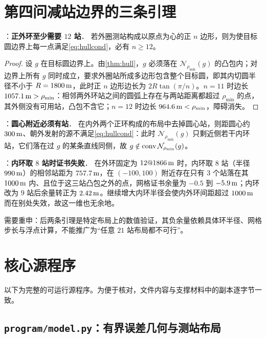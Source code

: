 \begin{appendices}
\section{第四问减站边界的三条引理}\label{app:q4}

\begin{lemma}：\textbf{正外环至少需要 $12$ 站}．\label{lem:outer12}
若外圈测站构成以原点为心的正 $n$ 边形，则为使目标圆边界上每一点满足\cref{eq:hullcond}，必有 $n\ge12$。
\end{lemma}
\begin{proof}
设 $g$ 在目标圆边界上。由\cref{thm:hull}，$g$ 必须落在 $\mathcal N_{\rho_{\min}}(g)$ 的凸包内；对边界上所有 $g$ 同时成立，要求外圈站所成多边形包含整个目标圆，即其内切圆半径不小于 $R=1800\,\mathrm{m}$，此时正 $n$ 边形边长为 $2R\tan(\pi/n)$。$n=11$ 时边长 $1057.1\,\mathrm{m}>\rho_{\min}$：相邻两外环站之间的圆弧上存在与两站距离都超过 $\rho_{\min}$ 的点，其外侧没有可用站，凸包不含它；$n=12$ 时边长 $964.6\,\mathrm{m}<\rho_{\min}$，障碍消失。
\end{proof}

\begin{lemma}：\textbf{圆心附近必须有站}．\label{lem:center}
在内外两个正环构成的布局中去掉圆心站，则距圆心约 $300\,\mathrm{m}$、朝外发射的源不满足\cref{eq:hullcond}：此时 $\mathcal N_{\rho_{\min}}(g)$ 只剩近侧若干内环站，它们落在过 $g$ 的某条直线同侧，故 $g\notin\operatorname{conv}\mathcal N_{\rho_{\min}}(g)$。
\end{lemma}

\begin{lemma}：\textbf{内环取 $8$ 站时证书失败}．\label{lem:inner9}
在外环固定为 $12@1866\,\mathrm{m}$ 时，内环取 $8$ 站（半径 $990\,\mathrm{m}$）的相邻站距为 $757.7\,\mathrm{m}$，在 $(-100,100)$ 附近存在只有 $3$ 个站落在其 $1000\,\mathrm{m}$ 内、且位于这三站凸包之外的点，网格证书余量为 $-0.5$ 到 $-5.9\,\mathrm{m}$；内环改为 $9$ 站后余量转正为 $2.42\,\mathrm{m}$。继续增大内环半径会使内外环间距超过 $1000\,\mathrm{m}$ 而在别处失效，故这一维也无余地。
\end{lemma}

需要重申：后两条引理是特定布局上的数值验证，其负余量依赖具体环半径、网格步长与浮点计算，不能推广为“任意 $21$ 站布局都不可行”。

\section{核心源程序}

以下为完整的可运行源程序。为便于核对，文件内容与支撑材料中的副本逐字节一致。

\subsection{\texttt{program/model.py}：有界误差几何与测站布局}



\end{appendices}
